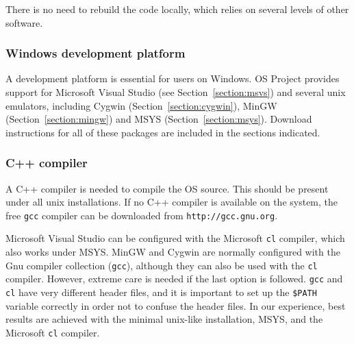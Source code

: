\documentclass[11pt]{article}
\renewcommand{\_}{{\char"5F}}
\renewcommand{\{}{{\char"7B}}
\renewcommand{\}}{{\char"7D}}
\renewcommand{\^}{{\char"0D}}
\renewcommand{\'}{{\char"0D}}
\newcommand{\UrlGcc}{http://gcc.gnu.org}
\begin{document}
%


There is no need to rebuild the code locally, which relies on several levels of other software.

\subsubsection{Windows development platform}\label{section:windowsdevelopment}
A development platform is essential for users on Windows. OS Project provides support for Microsoft Visual Studio
(see Section~\ref{section:msvs}) and several unix emulators, including Cygwin (Section~\ref{section:cygwin}),
MinGW (Section~\ref{section:mingw}) and MSYS (Section~\ref{section:msys}). Download instructions for all of these
packages are included in the sections indicated.

\subsubsection{C++ compiler}\label{section:cpp}
A C++ compiler is needed to compile the OS source. This should be present 
under all unix installations. If no C++ compiler is available on the system, the free {\tt gcc} 
compiler can be downloaded from {\tt\UrlGcc}.

Microsoft Visual Studio can be configured with the Microsoft {\tt cl} compiler, 
which also works under MSYS. MinGW and Cygwin are normally configured 
with the Gnu compiler collection ({\tt gcc}), although they can also be used with the {\tt cl} compiler. 
However, extreme care is needed if the last option is followed. {\tt gcc} and {\tt cl} have very different 
header files, and it is important to set up the {\tt \$PATH} variable correctly 
in order not to confuse the header files. 
In our experience, best results are achieved with the minimal unix-like installation, MSYS, and the 
Microsoft {\tt cl} compiler.
\end{document}
